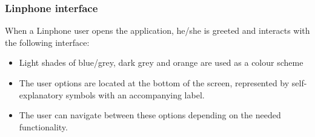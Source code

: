 \documentclass[11pt]{article}
\begin{document}
\subsubsection{Linphone interface}
When a Linphone user opens the application, he/she is greeted and interacts with the following interface:
\begin{itemize}
\item	Light shades of blue/grey, dark grey and orange are used as a colour scheme
\item	The user options are located at the bottom of the screen, represented by self-explanatory symbols with an accompanying label.
\item	The user can navigate between these options depending on the needed functionality.
\end{itemize}
\end{document}
